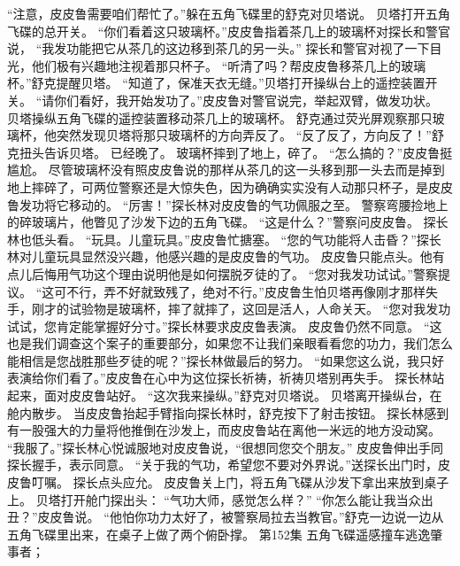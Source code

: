\documentclass[a4paper,12pt,UTF8,twoside]{ctexbook}
\begin{document}
        “注意，皮皮鲁需要咱们帮忙了。”躲在五角飞碟里的舒克对贝塔说。 
        贝塔打开五角飞碟的总开关。 
        “你们看着这只玻璃杯。”皮皮鲁指着茶几上的玻璃杯对探长和警官说，  “我发功能把它从茶几的这边移到茶几的另一头。” 
        探长和警官对视了一下目光，他们极有兴趣地注视着那只杯子。 
        “听清了吗？帮皮皮鲁移茶几上的玻璃杯。”舒克提醒贝塔。 
        “知道了，保准天衣无缝。”贝塔打开操纵台上的遥控装置开关。 
        “请你们看好，我开始发功了。”皮皮鲁对警官说完，举起双臂，做发功状。 
        贝塔操纵五角飞碟的遥控装置移动茶几上的玻璃杯。 
        舒克通过荧光屏观察那只玻璃杯，他突然发现贝塔将那只玻璃杯的方向弄反了。 
        “反了反了，方向反了！”舒克扭头告诉贝塔。 
        已经晚了。 
        玻璃杯摔到了地上，碎了。 
        “怎么搞的？”皮皮鲁挺尴尬。 
        尽管玻璃杯没有照皮皮鲁说的那样从茶几的这一头移到那一头去而是掉到地上摔碎了，可两位警察还是大惊失色，因为确确实实没有人动那只杯子，是皮皮鲁发功将它移动的。 
        “厉害！”探长林对皮皮鲁的气功佩服之至。 
        警察弯腰捡地上的碎玻璃片，他瞥见了沙发下边的五角飞碟。 
        “这是什么？”警察问皮皮鲁。 
        探长林也低头看。 
        “玩具。儿童玩具。”皮皮鲁忙搪塞。 
        “您的气功能将人击昏？”探长林对儿童玩具显然没兴趣，他感兴趣的是皮皮鲁的气功。 
        皮皮鲁只能点头。他有点儿后悔用气功这个理由说明他是如何摆脱歹徒的了。 
        “您对我发功试试。”警察提议。 
        “这可不行，弄不好就致残了，绝对不行。”皮皮鲁生怕贝塔再像刚才那样失手，刚才的试验物是玻璃杯，摔了就摔了，这回是活人，人命关天。 
        “您对我发功试试，您肯定能掌握好分寸。”探长林要求皮皮鲁表演。 
        皮皮鲁仍然不同意。 
        “这也是我们调查这个案子的重要部分，如果您不让我们亲眼看看您的功力，我们怎么能相信是您战胜那些歹徒的呢？”探长林做最后的努力。 
        “如果您这么说，我只好表演给你们看了。”皮皮鲁在心中为这位探长祈祷，祈祷贝塔别再失手。 
        探长林站起来，面对皮皮鲁站好。 
        “这次我来操纵。”舒克对贝塔说。 
        贝塔离开操纵台，在舱内散步。 
        当皮皮鲁抬起手臂指向探长林时，舒克按下了射击按钮。 
        探长林感到有一股强大的力量将他推倒在沙发上，而皮皮鲁站在离他一米远的地方没动窝。 
        “我服了。”探长林心悦诚服地对皮皮鲁说，“很想同您交个朋友。” 
        皮皮鲁伸出手同探长握手，表示同意。 
        “关于我的气功，希望您不要对外界说。”送探长出门时，皮皮鲁叮嘱。 
        探长点头应允。 
        皮皮鲁关上门，将五角飞碟从沙发下拿出来放到桌子上。 
        贝塔打开舱门探出头： 
        “气功大师，感觉怎么样？” 
        “你怎么能让我当众出丑？”皮皮鲁说。 
        “他怕你功力太好了，被警察局拉去当教官。”舒克一边说一边从五角飞碟里出来，在桌子上做了两个俯卧撑。   第152集 
        五角飞碟遥感撞车逃逸肇事者； 
\end{document}
